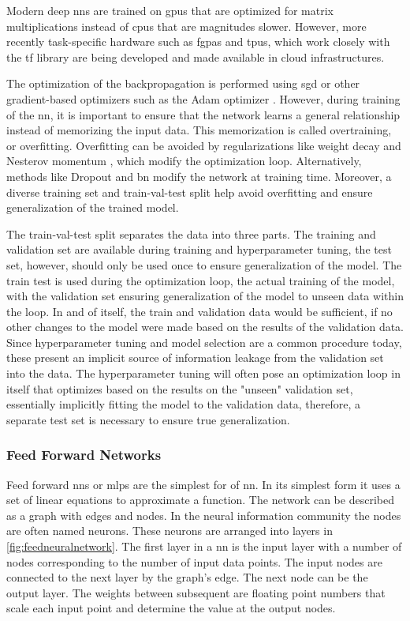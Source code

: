 Modern deep \acp{nn} are trained on \acp{gpu} that are optimized for matrix multiplications instead of \acp{cpu} that are magnitudes slower. However, more recently task-specific hardware such as \acp{fgpa} and \acp{tpu}, which work closely with the \ac{tf} library are being developed and made available in cloud infrastructures.

The optimization of the backpropagation is performed using \ac{sgd} or other gradient-based optimizers such as the Adam optimizer \citep{kingma2014adam}. However, during training of the \ac{nn}, it is important to ensure that the network learns a general relationship instead of memorizing the input data. This memorization is called overtraining, or overfitting. Overfitting can be avoided by regularizations like weight decay \citep{krogh1992simple} and Nesterov momentum \citep{pmlr-v28-sutskever13}, which modify the optimization loop. Alternatively, methods like Dropout \citep{hinton2012improving} and \ac{bn} \citep{ioffe2015batch} modify the network at training time. Moreover, a diverse training set and train-val-test split help avoid overfitting and ensure generalization of the trained model.

The train-val-test split separates the data into three parts. The training and validation set are available during training and hyperparameter tuning, the test set, however, should only be used once to ensure generalization of the model. The train test is used during the optimization loop, the actual training of the model, with the validation set ensuring generalization of the model to unseen data within the loop. In and of itself, the train and validation data would be sufficient, if no other changes to the model were made based on the results of the validation data. Since hyperparameter tuning and model selection are a common procedure today, these present an implicit source of information leakage from the validation set into the data. The hyperparameter tuning will often pose an optimization loop in itself that optimizes based on the results on the "unseen" validation set, essentially implicitly fitting the model to the validation data, therefore, a separate test set is necessary to ensure true generalization.


\subsubsection{Feed Forward Networks}
Feed forward \acfp{nn} or \acp{mlp} are the simplest for of \ac{nn}. In its simplest form it uses a set of linear equations to approximate a function. The network can be described as a graph with edges and nodes. In the neural information community the nodes are often named neurons. These neurons are arranged into layers in \cref{fig:feedneuralnetwork}. The first layer in a \ac{nn} is the input layer with a number of nodes corresponding to the number of input data points. The input nodes are connected to the next layer by the graph's edge. The next node can be the output layer. The weights between subsequent are floating point numbers that scale each input point and determine the value at the output nodes.

